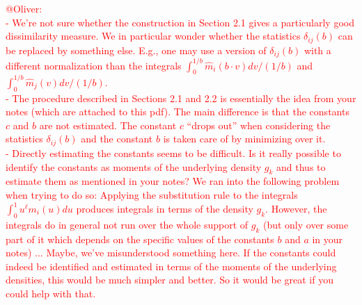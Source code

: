 \documentclass[a4paper,12pt]{article}
\numberwithin{equation}{section}
\begin{document}
\noindent \textcolor{red}{@Oliver: \\
- We're not sure whether the construction in Section 2.1 gives a particularly good dissimilarity measure. We in particular wonder whether the statistics $\delta_{ij}(b)$ can be replaced by something else. E.g., one may use a version of $\delta_{ij}(b)$ with a different normalization than the integrals $\int_0^{1/b} \hat{m}_i(b\cdot v) dv /(1/b)$ and $\int_0^{1/b} \hat{m}_j(v) dv /(1/b)$. \\
- The procedure described in Sections 2.1 and 2.2 is essentially the idea from your notes (which are attached to this pdf). The main difference is that the constants $c$ and $b$ are not estimated. The constant $c$ ``drops out'' when considering the statistics $\delta_{ij}(b)$ and the constant $b$ is taken care of by minimizing over it. \\
- Directly estimating the constants seems to be difficult. Is it really possible to identify the constants as moments of the underlying density $g_k$ and thus to estimate them as mentioned in your notes? We ran into the following problem when trying to do so: Applying the substitution rule to the integrals $\int_0^1 u^\ell m_i(u) du$ produces integrals in terms of the density $g_k$. However, the integrals do in general not run over the whole support of $g_k$ (but only over some part of it which depends on the specific values of the constants $b$ and $a$ in your notes) ... Maybe, we've misunderstood something here. If the constants could indeed be identified and estimated in terms of the moments of the underlying densities, this would be much simpler and better. So it would be great if you could help with that. 
}





\end{document}
